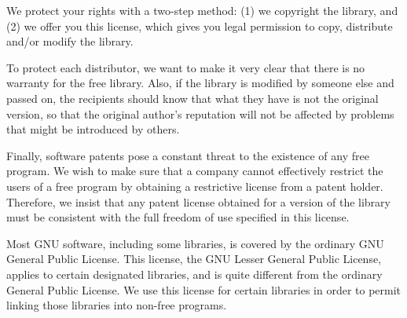 We protect your rights with a two-step method: (1) we copyright the library, and (2) we offer you this license, which gives you legal permission to copy, distribute and/or modify the library.

To protect each distributor, we want to make it very clear that there is no warranty for the free library. Also, if the library is modified by someone else and passed on, the recipients should know that what they have is not the original version, so that the original author's reputation will not be affected by problems that might be introduced by others.

Finally, software patents pose a constant threat to the existence of any free program. We wish to make sure that a company cannot effectively restrict the users of a free program by obtaining a restrictive license from a patent holder. Therefore, we insist that any patent license obtained for a version of the library must be consistent with the full freedom of use specified in this license.

Most GNU software, including some libraries, is covered by the ordinary GNU General Public License. This license, the GNU Lesser General Public License, applies to certain designated libraries, and is quite different from the ordinary General Public License. We use this license for certain libraries in order to permit linking those libraries into non-free programs.

